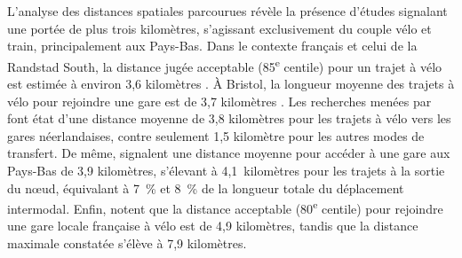\begin{refsegment}
L'analyse des distances spatiales parcourues révèle la présence d'études signalant une portée de plus trois kilomètres, s'agissant exclusivement du couple vélo et train, principalement aux Pays-Bas. Dans le contexte français et celui de la Randstad South, la distance jugée acceptable (85\textsuperscript{e} centile) pour un trajet à vélo est estimée à environ 3,6 kilomètres \textcolor{blue}{\autocites[62]{rabaud_quand_2022}[45]{la_paix_puello_modelling_2015}}. À Bristol, la longueur moyenne des trajets à vélo pour rejoindre une gare est de 3,7 kilomètres \textcolor{blue}{\autocite[192]{sherwin_practices_2011}}. Les recherches menées par \textcolor{blue}{\textcite[14]{shelat_analysing_2018}} font état d'une distance moyenne de 3,8 kilomètres pour les trajets à vélo vers les gares néerlandaises, contre seulement 1,5 kilomètre pour les autres modes de transfert. De même, \textcolor{blue}{\textcite[225-226]{keijer_how_2000}} signalent une distance moyenne pour accéder à une gare aux Pays-Bas de 3,9 kilomètres, s'élevant à 4,1~kilomètres pour les trajets à la sortie du nœud, équivalant à 7~\% et 8~\% de la longueur totale du déplacement intermodal. Enfin, \textcolor{blue}{\textcite[13]{hasiak_access_2019}} notent que la distance acceptable (80\textsuperscript{e} centile) pour rejoindre une gare locale française à vélo est de 4,9 kilomètres, tandis que la distance maximale constatée s'élève à 7,9 kilomètres.%


\end{refsegment}
